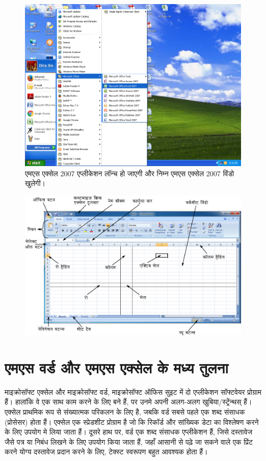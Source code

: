 \begin{figure}[H]
\centering
\includegraphics[scale=0.3]{src/images/chapter1/chapter1_fig01.png}
\caption{एमएस एक्सेल 2007 एप्लीकेशन लॉन्च हो जाएगी और निम्न एमएस एक्सेल 2007 विंडो खुलेगी।}\label{chap1_fig1}
\end{figure}

\begin{figure}[H]
\centering
\includegraphics[scale=0.9]{src/images/chapter1/chapter1_fig02.png}
\end{figure}

\section{एमएस वर्ड और एमएस एक्सेल के मध्य तुलना}\label{id-1.1}

माइक्रोसॉफ्ट एक्सेल और माइक्रोसॉफ्ट वर्ड, माइक्रोसॉफ्ट ऑफिस सुइट में दो एप्लीकेशन सॉफ्टवेयर प्रोग्राम हैं। हालांकि वे एक साथ काम करने के लिए बने हैं, पर उनमे अपनी अलग-अलग खुबिया/स्ट्रेंन्थस् हैं। एक्सेल प्राथमिक रूप से संख्यात्मक परिकलन के लिए है, जबकि वर्ड सबसे पहले एक शब्द संसाधक (प्रोसेसर) होता हैं। एक्सेल एक स्प्रेडशीट प्रोग्राम है जो कि रिकॉर्ड और सांख्यिक डेटा का विश्लेषण करने के लिए उपयोग मे लिया जाता हैं। दूसरे हाथ पर, वर्ड एक शब्द संसाधक एप्लीकेशन हैं, जिसे दस्तावेज जैसे पत्र या निबंध लिखने के लिए उपयोग किया जाता हैं, जहाँ आसानी से पढ़े जा सकने वाले एक प्रिंट करने योग्य दस्तावेज प्रदान करने के लिए, टेक्स्ट स्वरूपण बहुत आवश्यक होता हैं।

